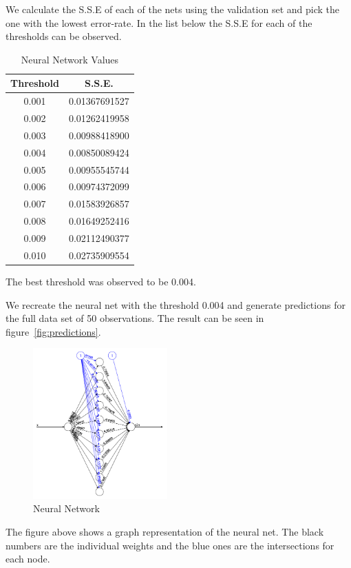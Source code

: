 \documentclass[a4paper, twocolumn]{article}
\begin{document}
    We calculate the S.S.E of each of the nets using the validation set and pick the one with the lowest error-rate. In the list below the S.S.E for each of the thresholds can be observed.

    

    \begin{table}[h!]
        \begin{center}
            \begin{tabular}{cc}
                \toprule
                \textbf{Threshold} & \textbf{S.S.E.} \\
                \midrule
                0.001 & 0.01367691527 \\
                0.002 & 0.01262419958 \\
                0.003 & 0.00988418900 \\
                0.004 & 0.00850089424 \\
                0.005 & 0.00955545744 \\
                0.006 & 0.00974372099 \\
                0.007 & 0.01583926857 \\
                0.008 & 0.01649252416 \\
                0.009 & 0.02112490377 \\
                0.010 & 0.02735909554 \\
                \bottomrule
            \end{tabular}
        \end{center}
        \caption{Neural Network Values}
        \label{tab:forecast}
    \end{table}
    The best threshold was observed to be 0.004.
    
    We recreate the neural net with the threshold 0.004 and generate predictions for the full data set of 50 observations. The result can be seen in figure~\ref{fig:predictions}.
    \begin{figure}[h!]
        \centering
        \caption{Neural Network}
        \label{fig:network}
        \includegraphics[width=0.46\textwidth]{share/network.png}
    \end{figure}
    The figure above shows a graph representation of the neural net. The black numbers are the individual weights and the blue ones are the intersections for each node.
\end{document}
